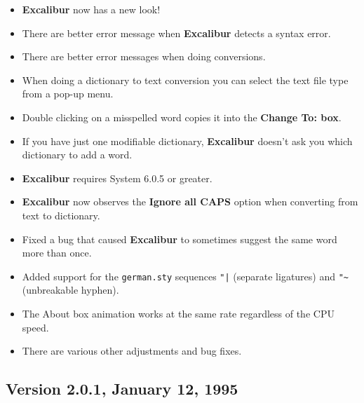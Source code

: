 ﻿\documentclass[11pt,titlepage]{article}
\newcommand{\ex}{\textbf{Excalibur}}
\begin{document}
\begin{itemize}
\item \ex{} now has a new look!

\item There are better error message when \ex{} detects a syntax
  error.

\item There are better error messages when doing conversions.

\item When doing a dictionary to text conversion you can select the
  text file type from a pop-up menu.

\item Double clicking on a misspelled word copies it into the
  \textbf{Change To: box}.

\item If you have just one modifiable dictionary, \ex{} doesn't ask
  you which dictionary to add a word.

\item \ex{} requires System 6.0.5 or greater.

\item \ex{} now observes the \textbf{Ignore all CAPS} option when
  converting from text to dictionary.

\item Fixed a bug that caused \ex{} to sometimes suggest the same word
  more than once.

\item Added support for the \texttt{german.sty} sequences \verb+"|+
  (separate ligatures) and \verb+"~+ (unbreakable hyphen).

\item The About box animation works at the same rate regardless of the
  CPU speed.

\item There are various other adjustments and bug fixes.

\end{itemize}

\subsection{Version 2.0.1, January 12, 1995}
\end{document}

